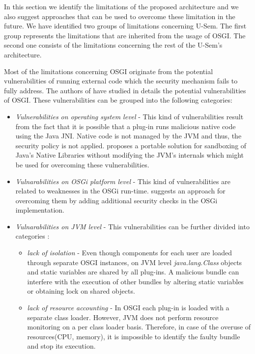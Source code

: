 In this section we identify the limitations of the proposed architecture and we also suggest approaches that can be used to overcome these limitation in the future. We have identified two groups of limitations concerning U-Sem. The first group represents the limitations that are inherited from the usage of OSGI. The second one consists of the limitations concerning the rest of the U-Sem's architecture.

Most of the limitations concerning OSGI originate from the potential vulnerabilities of running external code which the security mechanism fails to fully address. The authors of \cite{Parrend} have studied in details the potential vulnerabilities of OSGI. These vulnerabilities can be grouped into the following categories:

\begin{itemize}

	\item \textit{Vulnerabilities on operating system level} - This kind of vulnerabilities result from the fact that it is possible that a plug-in runs malicious native code using the Java JNI. Native code is not managed by the JVM and thus, the security policy is not applied. \cite{Sun} proposes a portable solution for sandboxing of Java's Native Libraries without modifying the JVM's internals which might be used for overcoming these vulnerabilities.
	
	\item \textit{Vulnarabilities on OSGi platform level} - This kind of vulnerabilities are related to weaknesses in the OSGi run-time. \cite{Parrend} suggests an approach for overcoming them by adding additional security checks in the OSGi implementation.
	
	\item \textit{Vulnarabilities on JVM level} - This vulnerabilities can be further divided into categories \cite{Geoffray}: 
	
	\begin{itemize}
		\item \textit{lack of isolation} - Even though components for each user are loaded through separate OSGI instances, on JVM level \textit{java.lang.Class} objects and static variables are shared by all plug-ins. A malicious bundle can interfere with the execution of other bundles by altering static variables or obtaining lock on shared objects.
		
		\item \textit{lack of resource accounting} - In OSGI each plug-in is loaded with a separate class loader. However, JVM does not perform resource monitoring on a per class loader basis. Therefore, in case of the overuse of resources(CPU, memory), it is impossible to identify the faulty bundle and stop its execution.
		

\end{itemize}
\end{itemize}
